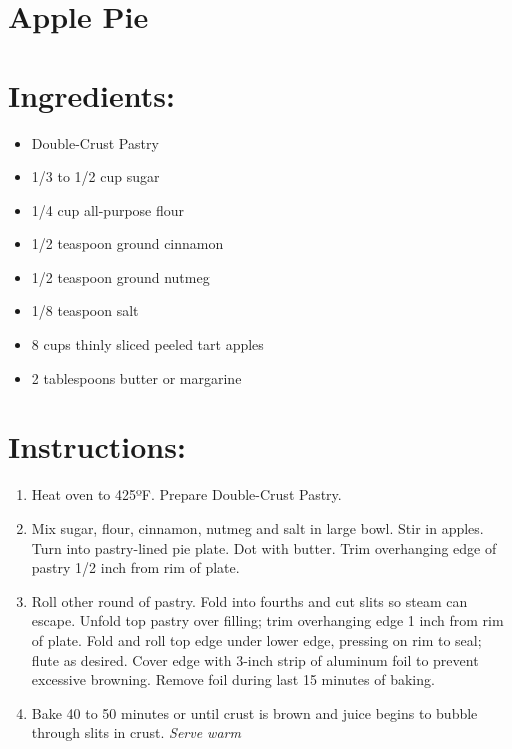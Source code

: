 \section{Apple Pie}
\section{Ingredients:}
\begin{itemize}
\item Double-Crust Pastry
\item 1/3 to 1/2 cup sugar
\item 1/4 cup all-purpose flour
\item 1/2 teaspoon ground cinnamon
\item 1/2 teaspoon ground nutmeg
\item 1/8 teaspoon salt
\item 8 cups thinly sliced peeled tart apples
\item 2 tablespoons butter or margarine
\end{itemize}

\section{Instructions:}
\begin{enumerate}
\item Heat oven to 425ºF. Prepare Double-Crust Pastry.
\item Mix sugar, flour, cinnamon, nutmeg and salt in large bowl. Stir in apples. Turn into pastry-lined pie plate. Dot with butter. Trim overhanging edge of pastry 1/2 inch from rim of plate.
\item Roll other round of pastry. Fold into fourths and cut slits so steam can escape. Unfold top pastry over filling; trim overhanging edge 1 inch from rim of plate. Fold and roll top edge under lower edge, pressing on rim to seal; flute as desired. Cover edge with 3-inch strip of aluminum foil to prevent excessive browning. Remove foil during last 15 minutes of baking.
\item Bake 40 to 50 minutes or until crust is brown and juice begins to bubble through slits in crust.
\emph{Serve warm} 

\end{enumerate}
